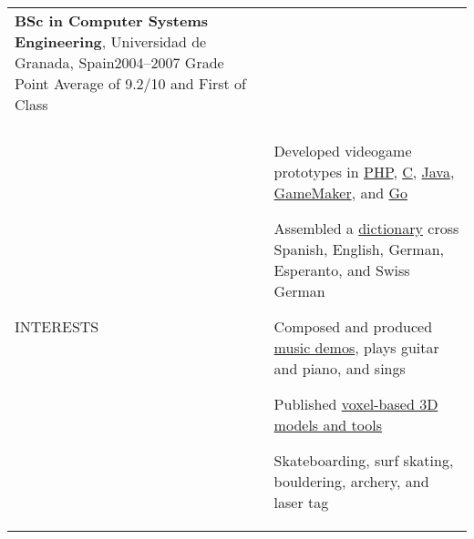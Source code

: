 \documentclass[letterpaper,10pt,oneside]{article}
\newcommand{\DatestampY}[1]{#1}
\newenvironment{body}
{\par\par
\begin{longtable}{p{0.142\textwidth}p{0.807\textwidth}}}
{\par\end{longtable}\par}
\renewcommand{\section}[3]{\\[-0.9cm]\pdfbookmark[2]{#2}{#3}\\%
\raggedleft  %
{\fontsize{9.5pt}{9.5pt}\selectfont\bfseries\raggedright%
\MakeUppercase{#1}}&}
\newcommand{\SmallEntryGap}{\par\vspace{0.1em}\par}
\begin{document}
\begin{body}
\SmallEntryGap

\textbf{BSc in Computer Systems Engineering}, Universidad de Granada, Spain\hfill \DatestampY{2004}--\DatestampY{2007} \newline
\phantom{w}Grade Point Average of 9.2/10 and First of Class


\section{Interests}{Interests}{PDF:Open Source}

Developed videogame prototypes in \href{https://github.com/lquesada/LifoSource}{PHP}, \href{https://github.com/lquesada/SpaceARMy}{C}, \href{https://github.com/lquesada/RogueCave}{Java}, \href{https://github.com/lquesada/PhysicsEngine}{GameMaker}, and \href{https://github.com/lquesada/Cavernal}{Go}

Assembled a \href{https://github.com/lquesada/Lingvaro}{dictionary} cross Spanish, English, German, Esperanto, and Swiss German

Composed and produced \href{https://github.com/lquesada/music}{music demos}, plays guitar and piano, and sings

Published \href{https://github.com/lquesada/voxel-3d-models}{voxel-based 3D models and tools}

Skateboarding, surf skating, bouldering, archery, and laser tag

\end{body}
\end{document}
